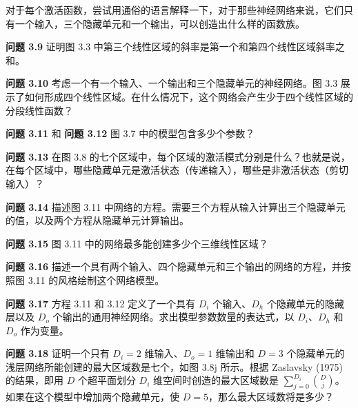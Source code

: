 对于每个激活函数，尝试用通俗的语言解释一下，对于那些神经网络来说，它们只有一个输入，三个隐藏单元和一个输出，可以创造出什么样的函数族。


\textbf{问题 3.9} 证明图 3.3 中第三个线性区域的斜率是第一个和第四个线性区域斜率之和。

\textbf{问题 3.10} 考虑一个有一个输入、一个输出和三个隐藏单元的神经网络。图 3.3 展示了如何形成四个线性区域。在什么情况下，这个网络会产生少于四个线性区域的分段线性函数？

\textbf{问题 3.11} 和 \textbf{问题 3.12} 图 3.7 中的模型包含多少个参数？

\textbf{问题 3.13} 在图 3.8 的七个区域中，每个区域的激活模式分别是什么？也就是说，在每个区域中，哪些隐藏单元是激活状态（传递输入），哪些是非激活状态（剪切输入）？

\textbf{问题 3.14} 描述图 3.11 中网络的方程。需要三个方程从输入计算出三个隐藏单元的值，以及两个方程从隐藏单元计算输出。

\textbf{问题 3.15} 图 3.11 中的网络最多能创建多少个三维线性区域？

\textbf{问题 3.16} 描述一个具有两个输入、四个隐藏单元和三个输出的网络的方程，并按照图 3.11 的风格绘制这个网络模型。

\textbf{问题 3.17} 方程 3.11 和 3.12 定义了一个具有 \(D_i\) 个输入、\(D_h\) 个隐藏单元的隐藏层以及 \(D_o\) 个输出的通用神经网络。求出模型参数数量的表达式，以 \(D_i\)、\(D_h\) 和 \(D_o\) 作为变量。

\textbf{问题 3.18} 证明一个只有 \(D_i = 2\) 维输入、\(D_o = 1\) 维输出和 \(D = 3\) 个隐藏单元的浅层网络所能创建的最大区域数是七个，如图 3.8j 所示。根据 Zaslavsky (1975) 的结果，即用 \(D\) 个超平面划分 \(D_i\) 维空间时创造的最大区域数是 \(\sum_{j=0}^{D_i} \binom{D}{j}\)。如果在这个模型中增加两个隐藏单元，使 \(D = 5\)，那么最大区域数将是多少？

